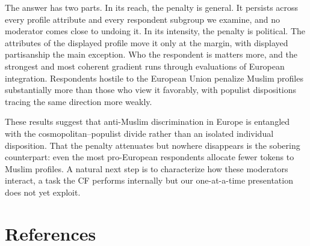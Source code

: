 \documentclass[
  10pt,
  a4paper,
  DIV=11,
  numbers=noendperiod]{scrartcl}
\begin{document}
The answer has two parts. In its reach, the penalty is general. It
persists across every profile attribute and every respondent subgroup we
examine, and no moderator comes close to undoing it. In its intensity,
the penalty is political. The attributes of the displayed profile move
it only at the margin, with displayed partisanship the main exception.
Who the respondent is matters more, and the strongest and most coherent
gradient runs through evaluations of European integration. Respondents
hostile to the European Union penalize Muslim profiles substantially
more than those who view it favorably, with populist dispositions
tracing the same direction more weakly.

These results suggest that anti-Muslim discrimination in Europe is
entangled with the cosmopolitan--populist divide rather than an isolated
individual disposition. That the penalty attenuates but nowhere
disappears is the sobering counterpart: even the most pro-European
respondents allocate fewer tokens to Muslim profiles. A natural next
step is to characterize how these moderators interact, a task the CF
performs internally but our one-at-a-time presentation does not yet
exploit.

\section{References}\label{references}
\end{document}
